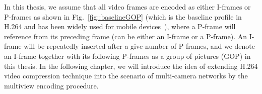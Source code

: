 In this thesis, we assume that all video frames are encoded as either I-frames or P-frames as shown in Fig.~\ref{fig::baselineGOP} (which is the baseline profile in H.264 and has been widely used for mobile devices~\cite{h264Recommendation}), where a P-frame will reference from its preceding frame (can be either an I-frame or a P-frame).
An I-frame will be repeatedly inserted after a give number of P-frames, and we denote an I-frame together with its following P-frames as a group of pictures (GOP) in this thesis.
In the following chapter, we will introduce the idea of extending H.264 video compression technique into the scenario of multi-camera networks by the multiview encoding procedure.
